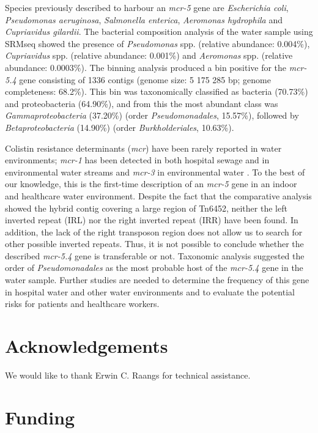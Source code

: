 Species previously described to harbour an \textit{mcr-5} gene are \textit{Escherichia coli}, \textit{Pseudomonas aeruginosa}, \textit{Salmonella enterica}, \textit{Aeromonas hydrophila} and \textit{Cupriavidus gilardii}. 
The bacterial composition analysis of the water sample using SRMseq showed the presence of \textit{Pseudomonas} spp. (relative abundance: 0.004\%), \textit{Cupriavidus} spp. (relative abundance: 0.001\%) and \textit{Aeromonas} spp. (relative abundance: 0.0003\%). 
The binning analysis produced a bin positive for the \textit{mcr-5.4} gene consisting of 1336 contigs (genome size: 5 175 285 bp; genome completeness: 68.2\%). 
This bin was taxonomically classified as bacteria (70.73\%) and proteobacteria (64.90\%), and from this the most abundant class was \textit{Gammaproteobacteria} (37.20\%) (order \textit{Pseudomonadales}, 15.57\%), followed by \textit{Betaproteobacteria} (14.90\%) (order \textit{Burkholderiales}, 10.63\%).

Colistin resistance determinants (\textit{mcr}) have been rarely reported in water environments; \textit{mcr-1} has been detected in both hospital sewage and in environmental water streams and \textit{mcr-3} in environmental water \citep{zhao_incp_2017, tuo_prevalence_2018}.
To the best of our knowledge, this is the first-time description of an \textit{mcr-5} gene in an indoor and healthcare water environment. 
Despite the fact that the comparative analysis showed the hybrid contig covering a large region of Tn6452, neither the left inverted repeat (IRL) nor the right inverted repeat (IRR) have been found. 
In addition, the lack of the right transposon region does not allow us to search for other possible inverted repeats. 
Thus, it is not possible to conclude whether the described \textit{mcr-5.4} gene is transferable or not. 
Taxonomic analysis suggested the order of \textit{Pseudomonadales} as the most probable host of the \textit{mcr-5.4} gene in the water sample. 
Further studies are needed to determine the frequency of this gene in hospital water and other water environments and to evaluate the potential risks for patients and healthcare workers.

\section{Acknowledgements}

We would like to thank Erwin C. Raangs for technical assistance.

\section{Funding}

